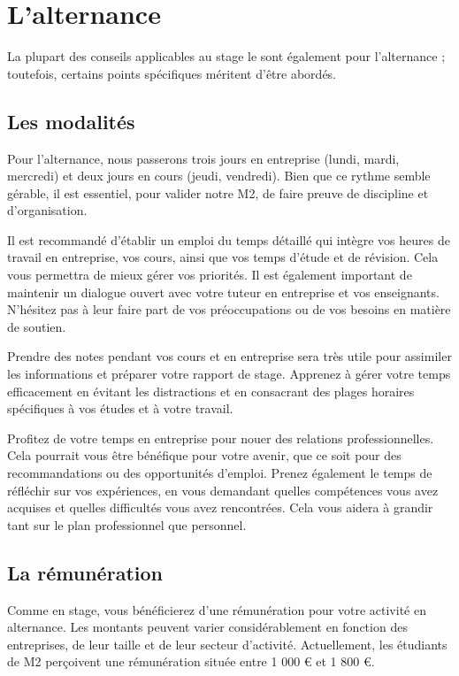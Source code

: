 \documentclass[a4paper, 12pt]{report}
\begin{document}
\chapter{L'alternance}

La plupart des conseils applicables au stage le sont également pour l’alternance ; toutefois, certains points spécifiques méritent d’être abordés.

\section{Les modalités}

Pour l'alternance, nous passerons trois jours en entreprise (lundi, mardi, mercredi) et deux jours en cours (jeudi, vendredi). Bien que ce rythme semble gérable, il est essentiel, pour valider notre M2, de faire preuve de discipline et d'organisation.

Il est recommandé d'établir un emploi du temps détaillé qui intègre vos heures de travail en entreprise, vos cours, ainsi que vos temps d'étude et de révision. Cela vous permettra de mieux gérer vos priorités. Il est également important de maintenir un dialogue ouvert avec votre tuteur en entreprise et vos enseignants. N'hésitez pas à leur faire part de vos préoccupations ou de vos besoins en matière de soutien.

Prendre des notes pendant vos cours et en entreprise sera très utile pour assimiler les informations et préparer votre rapport de stage. Apprenez à gérer votre temps efficacement en évitant les distractions et en consacrant des plages horaires spécifiques à vos études et à votre travail.

Profitez de votre temps en entreprise pour nouer des relations professionnelles. Cela pourrait vous être bénéfique pour votre avenir, que ce soit pour des recommandations ou des opportunités d'emploi. Prenez également le temps de réfléchir sur vos expériences, en vous demandant quelles compétences vous avez acquises et quelles difficultés vous avez rencontrées. Cela vous aidera à grandir tant sur le plan professionnel que personnel.


\section{La rémunération}

Comme en stage, vous bénéficierez d’une rémunération pour votre activité en alternance. Les montants peuvent varier considérablement en fonction des entreprises, de leur taille et de leur secteur d’activité. Actuellement, les étudiants de M2 perçoivent une rémunération située entre 1 000 € et 1 800 €. 
\end{document}
